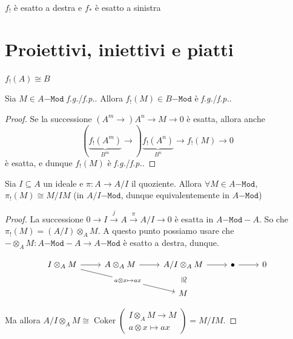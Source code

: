 \begin{corollary}{}
    \(f_!\) è esatto a destra e \(f_*\) è esatto a sinistra
\end{corollary}

\section{Proiettivi, iniettivi e piatti}

\begin{remark}{}
    \(f_! {(A)} \cong B\) 
\end{remark}

\begin{proposition}{}
    Sia \(M \in A\mathtt{-Mod}\) \emph{f.g.}/\emph{f.p.}. Allora \(f_!{(M)} \in
    B\mathtt{-Mod}\) è \emph{f.g.}/\emph{f.p.}.
\end{proposition}
\begin{proof}{}
    Se la successione \((A^{m} \to )A^{n} \to M \to 0\) è esatta, allora anche 
    \[
        {(\underbrace{f_!{(A^{m})}}_{B^{m}} \to )}
        \underbrace{f_!{(A^{n})}}_{B^{n}} \to f_!{(M)} \to 0
    \]
    è esatta, e dunque \(f_!{(M)}\) è \emph{f.g.}/\emph{f.p.}.
\end{proof}

\begin{corollary}{}
    Sia \(I \subseteq A \) un ideale e \(\pi : A \to {A}/{I}\) il quoziente.
    Allora \(\forall M \in A\mathtt{-Mod}\), \(\pi_! {(M)} \cong {M}/{IM}\) (in
    \(A / I\mathtt{-Mod}\), dunque equivalentemente in \(A\mathtt{-Mod}\))
\end{corollary}
\begin{proof}{}
    La successione \(0 \to I \overset{j}{\to} A \overset{\pi}{\to} A / I \to 0\) è
    esatta in \(A\mathtt{-Mod-}A\). So che \(\pi_! {(M)} = {(A / I)} \otimes_A
    M\). A questo punto possiamo usare che \(- \otimes_A M : A\mathtt{-Mod-}A
    \to A\mathtt{-Mod}\) è esatto a destra, dunque. 

\[\begin{tikzcd}
	I \otimes_A M & A \otimes_A M & A / I \otimes_A M & \bullet & 0 \\
	&& M
	\arrow[from=1-1, to=1-2]
	\arrow["{a\otimes x \mapsto ax}"{description}, from=1-1, to=2-3]
	\arrow[from=1-2, to=1-3]
	\arrow[from=1-3, to=1-4]
	\arrow["\cong"{marking, allow upside down}, draw=none, from=1-3, to=2-3]
	\arrow[from=1-4, to=1-5]
\end{tikzcd}\]

Ma allora \(
A/I \otimes_A M
  \cong
\operatorname{Coker}\!\left(
\substack{
I\otimes_A M \to M\\
a\otimes x \mapsto ax
}
\right)
=
M/IM.
\)
\end{proof}

